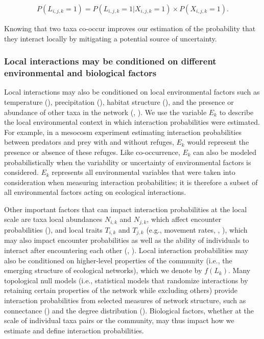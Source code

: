 \begin{eqnarray}
  \label{eq:co-occur}
    P(L_{i, j, k} = 1) = P(L_{i, j, k} = 1| X_{i,j,k} = 1) \times P(X_{i,j,k} =
    1).
\end{eqnarray}

Knowing that two taxa co-occur improves our estimation of the probability that
they interact locally by mitigating a potential source of uncertainty.

\subsubsection{Local interactions may be conditioned on different environmental and biological factors}

Local interactions may also be conditioned on local environmental factors such
as temperature (\cite{Angilletta2004Temperature}), precipitation
(\cite{Woodward2012Climate}), habitat structure (\cite{Klecka2014Effect}), and
the presence or abundance of other taxa in the network
(\cite{Pilosof2017Multilayer}, \cite{Kefi2012More}). We use the variable $E_k$
to describe the local environmental context in which interaction probabilities
were estimated. For example, in a mesocosm experiment estimating interaction
probabilities between predators and prey with and without refuges, $E_k$ would
represent the presence or absence of these refuges. Like co-occurrence, $E_k$
can also be modeled probabilistically when the variability or uncertainty of
environmental factors is considered. $E_k$ represents all environmental
variables that were taken into consideration when measuring interaction
probabilities; it is therefore a subset of all environmental factors acting on
ecological interactions. 

Other important factors that can impact interaction probabilities at the local
scale are taxa local abundances $N_{i,k}$ and $N_{j,k}$, which affect encounter
probabilities (\cite{Canard2012Emergence}), and local traits $T_{i,k}$ and
$T_{j,k}$ (e.g., movement rates, \cite{Beardsell2021Derivation},
\cite{Cherif2024Environment}), which may also impact encounter probabilities as
well as the ability of individuals to interact after encountering each other
(\cite{Caron2024Traitmatching}, \cite{Poisot2015Species}). Local interaction
probabilities may also be conditioned on higher-level properties of the
community (i.e., the emerging structure of ecological networks), which we denote
by $f(L_k)$. Many topological null models (i.e., statistical models that
randomize interactions by retaining certain properties of the network while
excluding others) provide interaction probabilities from selected measures of
network structure, such as connectance (\cite{Fortuna2006Habitat}) and the
degree distribution (\cite{Bascompte2003Nested}). Biological factors, whether at
the scale of individual taxa pairs or the community, may thus impact how we
estimate and define interaction probabilities.

